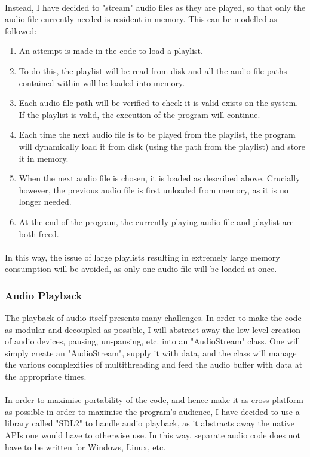 \paragraph{}
Instead, I have decided to "stream" audio files as they are played, so that only the audio file currently needed is resident in memory. This can be modelled as followed:
\begin{enumerate}
	\item An attempt is made in the code to load a playlist.
	\item To do this, the playlist will be read from disk and all the audio file paths contained within will be loaded into memory.
	\item Each audio file path will be verified to check it is valid exists on the system. If the playlist is valid, the execution of the program will continue.
	\item Each time the next audio file is to be played from the playlist, the program will dynamically load it from disk (using the path from the playlist) and store it in memory.
	\item When the next audio file is chosen, it is loaded as described above. Crucially however, the previous audio file is first unloaded from memory, as it is no longer needed.
	\item At the end of the program, the currently playing audio file and playlist are both freed.
\end{enumerate}

\paragraph{}
In this way, the issue of large playlists resulting in extremely large memory consumption will be avoided, as only one audio file will be loaded at once.

\subsubsection{Audio Playback}
The playback of audio itself presents many challenges. In order to make the code as modular and decoupled as possible, I will abstract away the low-level creation of audio devices, pausing, un-pausing, etc. into an "AudioStream" class. One will simply create an "AudioStream", supply it with data, and the class will manage the various complexities of multithreading and feed the audio buffer with data at the appropriate times.

\paragraph{}
In order to maximise portability of the code,  and hence make it as cross-platform as possible in order to maximise the program's audience, I have decided to use a library called "SDL2" to handle audio playback, as it abstracts away the native APIs one would have to otherwise use. In this way, separate audio code does not have to be written for Windows, Linux, etc.

